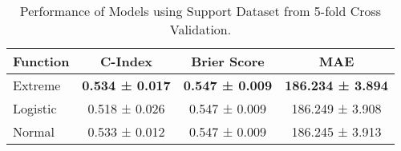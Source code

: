 \begin{table}[h!]
\centering
\caption{Performance of Models using Support Dataset from 5-fold Cross Validation.}
\label{tab:model_performance_support_0}
\begin{tabular}{l|c|c|c}
\hline
\textbf{Function} & \textbf{C-Index} & \textbf{Brier Score} & \textbf{MAE} \\
\hline
Extreme & \textbf{0.534 ± 0.017} & \textbf{0.547 ± 0.009} & \textbf{186.234 ± 3.894} \\
Logistic & 0.518 ± 0.026 & 0.547 ± 0.009 & 186.249 ± 3.908 \\
Normal & 0.533 ± 0.012 & 0.547 ± 0.009 & 186.245 ± 3.913 \\
\hline
\end{tabular}
\end{table}
